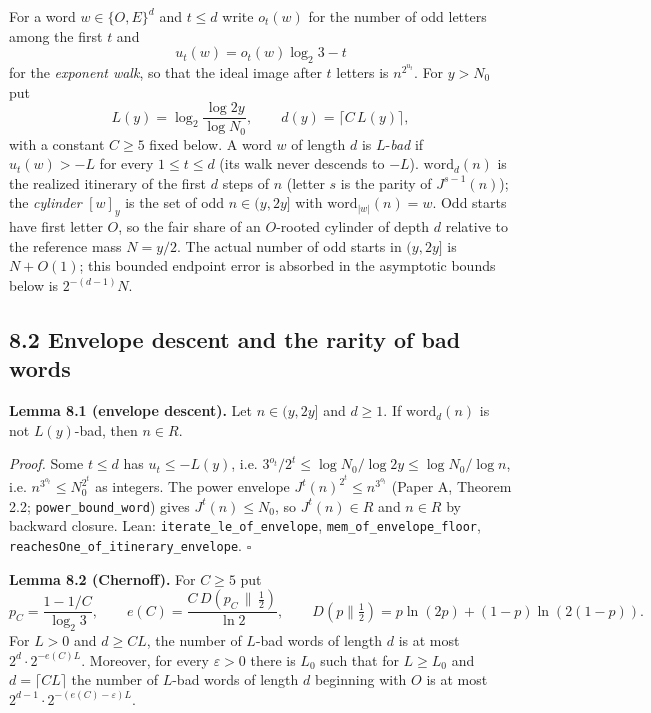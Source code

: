 \documentclass[11pt,a4paper]{article}
\begin{document}
For a word \(w\in\{O,E\}^d\) and \(t\le d\) write \(o_t(w)\) for the
number of odd letters among the first \(t\) and \[
u_t(w)=o_t(w)\log_2 3-t
\] for the \emph{exponent walk}, so that the ideal image after \(t\)
letters is \(n^{2^{u_t}}\). For \(y>N_0\) put \[
L(y)=\log_2\frac{\log 2y}{\log N_0},\qquad d(y)=\lceil C\,L(y)\rceil ,
\] with a constant \(C\ge 5\) fixed below. A word \(w\) of length \(d\)
is \(L\)-\emph{bad} if \(u_t(w)>-L\) for every \(1\le t\le d\) (its walk
never descends to \(-L\)). \(\mathrm{word}_d(n)\) is the realized
itinerary of the first \(d\) steps of \(n\) (letter \(s\) is the parity
of \(J^{s-1}(n)\)); the \emph{cylinder} \([w]_y\) is the set of odd
\(n\in(y,2y]\) with \(\mathrm{word}_{|w|}(n)=w\). Odd starts have first
letter \(O\), so the fair share of an \(O\)-rooted cylinder of depth
\(d\) relative to the reference mass \(N=y/2\). The actual number of odd
starts in \((y,2y]\) is \(N+O(1)\); this bounded endpoint error is
absorbed in the asymptotic bounds below is \(2^{-(d-1)}N\).

\subsection{8.2 Envelope descent and the rarity of bad
words}\label{envelope-descent-and-the-rarity-of-bad-words}

\textbf{Lemma 8.1 (envelope descent).} Let \(n\in(y,2y]\) and
\(d\ge 1\). If \(\mathrm{word}_d(n)\) is not \(L(y)\)-bad, then
\(n\in R\).

\emph{Proof.} Some \(t\le d\) has \(u_t\le -L(y)\), i.e.
\(3^{o_t}/2^t\le\log N_0/\log 2y\le\log N_0/\log n\), i.e.
\(n^{3^{o_t}}\le N_0^{2^t}\) as integers. The power envelope
\(J^t(n)^{2^t}\le n^{3^{o_t}}\) (Paper A, Theorem 2.2;
\texttt{\nolinkurl{power_bound_word}}) gives \(J^t(n)\le N_0\), so
\(J^t(n)\in R\) and \(n\in R\) by backward closure. Lean:
\texttt{\nolinkurl{iterate_le_of_envelope}},
\texttt{\nolinkurl{mem_of_envelope_floor}},
\texttt{\nolinkurl{reachesOne_of_itinerary_envelope}}. \(\square\)

\textbf{Lemma 8.2 (Chernoff).} For \(C\ge 5\) put \[
p_C=\frac{1-1/C}{\log_2 3},\qquad
e(C)=\frac{C\,D(p_C\,\|\,\tfrac12)}{\ln 2},\qquad
D(p\|\tfrac12)=p\ln(2p)+(1-p)\ln(2(1-p)).
\] For \(L>0\) and \(d\ge CL\), the number of \(L\)-bad words of length
\(d\) is at most \(2^d\cdot 2^{-e(C)L}\). Moreover, for every
\(\varepsilon>0\) there is \(L_0\) such that for \(L\ge L_0\) and
\(d=\lceil CL\rceil\) the number of \(L\)-bad words of length \(d\)
beginning with \(O\) is at most
\(2^{d-1}\cdot 2^{-(e(C)-\varepsilon)L}\).
\end{document}

